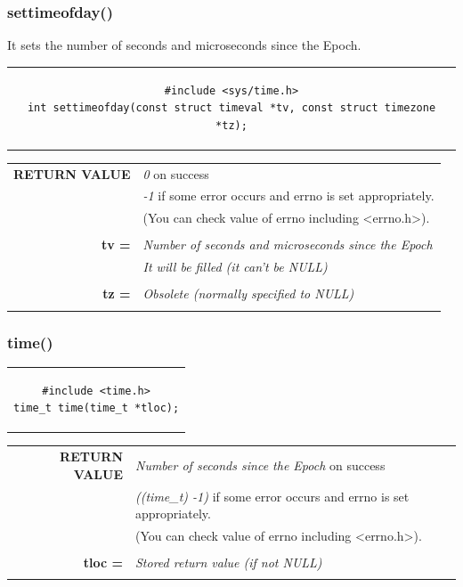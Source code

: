 \subsubsection{settimeofday()}
It sets the number of seconds and microseconds since the Epoch.
\begin{center}
\begin{tabular}{c}
\begin{lstlisting}[linewidth=370pt, basicstyle=\footnotesize\sffamily,]
#include <sys/time.h>
int settimeofday(const struct timeval *tv, const struct timezone *tz);
\end{lstlisting}
\end{tabular}
\end{center}

\begin{table}[H]
\centering\footnotesize
\begin{tabular}{rl}
\textbf{RETURN VALUE} & {\textit{0} on success}\\
{} & {\textit{-1} if some error occurs and errno is set appropriately.}\\
{} & {(You can check value of errno including <errno.h>).}\\
& \\
\textbf{tv =} & {\textit{Number of seconds and microseconds since the Epoch}}\\
{} & {\textit{It will be filled (it can't be NULL)}}\\
& \\
\textbf{tz =} & {\textit{Obsolete (normally specified to NULL)}}\\
&\\
\end{tabular}
\end{table}

\subsubsection{time()}
\begin{center}
\begin{tabular}{c}
\begin{lstlisting}[linewidth=140pt, basicstyle=\footnotesize\sffamily,]
#include <time.h>
time_t time(time_t *tloc);
\end{lstlisting}
\end{tabular}
\end{center}

\begin{table}[H]
\centering\footnotesize
\begin{tabular}{rl}
\textbf{RETURN VALUE} & {\textit{Number of seconds since the Epoch} on success}\\
{} & {\textit{((time\_t) -1)} if some error occurs and errno is set appropriately.}\\
{} & {(You can check value of errno including <errno.h>).}\\
& \\
\textbf{tloc =} & {\textit{Stored return value (if not NULL)}}\\
& \\
\end{tabular}
\end{table}

